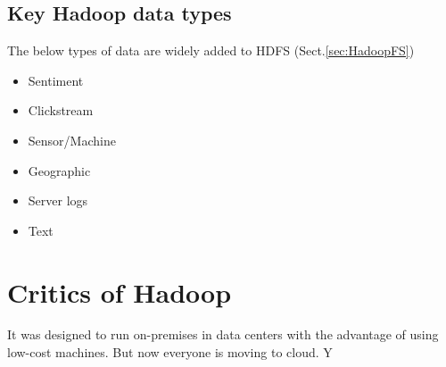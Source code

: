 \subsection{Key Hadoop data types}

The below types of data are widely added to HDFS (Sect.\ref{sec:HadoopFS})
\begin{itemize}
  \item Sentiment
  \item Clickstream
  \item Sensor/Machine
  \item Geographic
  \item Server logs
  \item Text
\end{itemize}


\section{Critics of Hadoop}

It was designed to run on-premises in data centers with the advantage of using
low-cost machines.
But now everyone is moving to cloud. Y

